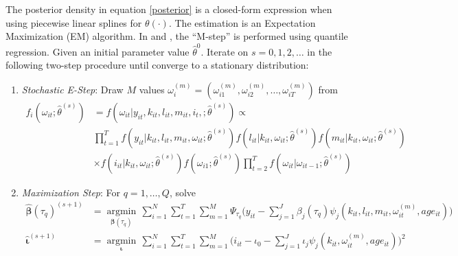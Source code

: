 \documentclass{article}
\begin{document}
The posterior density in equation \eqref{posterior} is a closed-form expression when using piecewise linear splines for $\theta(\cdot)$. The estimation is an Expectation Maximization (EM) algorithm. In \cite{Arellano2016} and \cite{Arellano2017}, the ``M-step'' is performed using quantile regression. Given an initial parameter value $\hat{\theta}^{0}$. Iterate on $s=0,1,2,\dots$ in the following two-step procedure until converge to a stationary distribution:

\begin{enumerate}
    \item \textit{Stochastic E-Step}: Draw $M$ values $\omega_{i}^{(m)}=(\omega_{i1}^{(m)}, \omega_{i2}^{(m)},\dots, \omega_{iT}^{(m)})$ from
        \begin{equation*}
        \begin{split}
            f_{i}(\omega_{it};\hat{\theta}^{(s)})&=f(\omega_{it}|y_{it}, k_{it}, l_{it}, m_{it}, i_{t},; \hat{\theta}^{(s)}) \propto\\
            &\prod_{t=1}^{T}f(y_{it}|k_{it}, l_{it}, m_{it}, \omega_{it};\hat{\theta}^{(s)})f(l_{it}|k_{it}, \omega_{it};\hat{\theta}^{(s)})f(m_{it}|k_{it}, \omega_{it};\hat{\theta}^{(s)}) \\
            &\times f(i_{it}|k_{it}, \omega_{it};\hat{\theta}^{(s)})f(\omega_{i1};\hat{\theta}^{(s)})\prod_{t=2}^{T}f(\omega_{it}|\omega_{it-1};\hat{\theta}^{(s)})
            \end{split}
        \end{equation*}
    \item \textit{Maximization Step}: For $q=1,\dots, Q$, solve
    \begin{equation*}
    \begin{split}
    \hat{\boldsymbol\beta}(\tau_{q})^{(s+1)}&=\underset{\boldsymbol\beta(\tau_{q})}{\operatorname{argmin}}\,\sum_{i=1}^{N}\sum_{t=1}^{T}\sum_{m=1}^{M}\Psi_{\tau_{q}}\bigg(y_{it}-\sum_{j=1}^{J}\beta_{j}(\tau_{q})\psi_{j}(k_{it}, l_{it}, m_{it}, \omega_{it}^{(m)}, age_{it})\bigg)\\
    \hat{\boldsymbol\iota}^{(s+1)}&=\underset{\boldsymbol\iota}{\operatorname{argmin}}\,\sum_{i=1}^{N}\sum_{t=1}^{T}\sum_{m=1}^{M}\bigg(i_{it}-\iota_{0}-\sum_{j=1}^{J}\iota_{j}\psi_{j}(k_{it}, \omega_{it}^{(m)}, age_{it})\bigg)^{2}\\
    \end{split}
    \end{equation*}
    

\end{enumerate}
\end{document}
